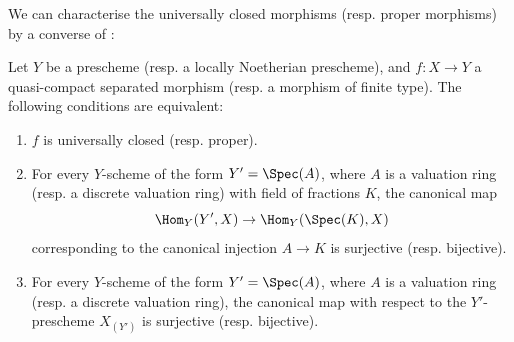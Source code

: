 We can characterise the universally closed morphisms (resp. proper morphisms) by a converse of :
\begin{theorem}[7.3.8]
\label{II.7.3.8}
Let $Y$ be a prescheme (resp. a locally Noetherian prescheme), and $f:X\to Y$ a quasi-compact separated morphism (resp. a morphism of finite type).
The following conditions are equivalent:
\begin{enumerate}
    \item[\rm{(a)}] $f$ is universally closed (resp. proper).
    \item[\rm{(b)}] For every $Y$-scheme of the form $Y'=\Spec(A)$, where $A$ is a valuation ring (resp. a discrete valuation ring) with field of fractions $K$, the canonical map
        \[
            \Hom_Y(Y',X) \to \Hom_Y(\Spec(K),X)
        \]
        corresponding to the canonical injection $A\to K$ is surjective (resp. bijective).
    \item[\rm{(c)}] For every $Y$-scheme of the form $Y'=\Spec(A)$, where $A$ is a valuation ring (resp. a discrete valuation ring), the canonical map  with respect to the $Y'$-prescheme $X_{(Y')}$ is surjective (resp. bijective).
\end{enumerate}
\end{theorem}

